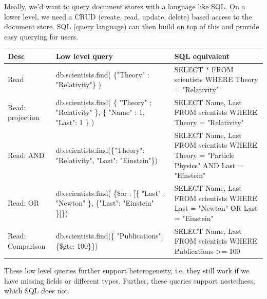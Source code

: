 \documentclass[11pt,oneside,a4paper]{article}
\begin{document}
Ideally, we'd want to query document stores with a language like SQL. On a lower level, we need a CRUD (create, read, update, delete) based access to the document store. SQL (query language) can then build on top of this and provide easy querying for users.\\

\begin{table}[hb!]
\centering
\begin{tabular}{|p{20mm}|p{75mm}|p{75mm}|}
	\hline 
	Desc & Low level query & SQL equivalent\\ 
	\hline 
	Read & db.scientists.find(
	\{"Theory" : "Relativity"\}
	) & SELECT *
	FROM scientists
	WHERE Theory = "Relativity" \\ 
	\hline 
	Read: projection & db.scientists.find(
	\{ "Theory" : "Relativity" \},
	\{ "Name" : 1, "Last": 1 \}
	) & SELECT Name, Last
	FROM scientists
	WHERE Theory = "Relativity" \\ 
	\hline 
	Read: AND & db.scientists.find(\{"Theory": "Relativity", "Last": "Einstein"\}) & SELECT Name, Last
	FROM scientists
	WHERE Theory = "Particle Physics"
	AND Last = "Einstein" \\ 
	\hline 
	Read: OR & db.scientists.find(
	\{\$or : [\{ "Last" : "Newton" \},	\{"Last": "Einstein" \}]\}) & SELECT Name, Last
	FROM scientists
	WHERE Last = "Newton"
	OR Last = "Einstein" \\ 
	\hline 
	Read: Comparison & db.scientists.find(\{ "Publications": \{\$gte: 100\}\}) & SELECT Name, Last
	FROM scientists
	WHERE Publications >= 100 \\ 
	\hline 
\end{tabular}
\end{table}


These low level queries further support heterogeneity, i.e. they still work if we have missing fields or different types. Further, these queries support nestedness, which SQL does not.
\end{document}
